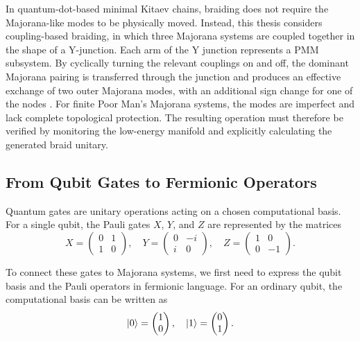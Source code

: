 In quantum-dot-based minimal Kitaev chains, braiding does not require the Majorana-like modes to be physically moved. Instead, this thesis considers coupling-based braiding, in which three Majorana systems are coupled together in the shape of a Y-junction. Each arm of the Y junction represents a PMM subsystem. By cyclically turning the relevant
couplings on and off, the dominant Majorana pairing is transferred through the junction and produces an effective exchange of two outer Majorana modes, with an additional sign change for one of the nodes \cite{nitschAdiabaticNonabelianBraiding2025}. For finite Poor Man's Majorana systems, the modes are imperfect and lack complete topological protection. The resulting operation must therefore be verified by monitoring
the low-energy manifold and explicitly calculating the generated braid unitary.


\subsection{From Qubit Gates to Fermionic Operators\newline}
Quantum gates are unitary operations acting on a chosen computational basis. For a single qubit, the Pauli gates $X$, $Y$, and $Z$ are represented by the matrices
\begin{equation}
X = \begin{pmatrix}
0 & 1 \\
1 & 0
\end{pmatrix}, \quad
Y = \begin{pmatrix}
0 & -i \\
i & 0
\end{pmatrix}, \quad
Z = \begin{pmatrix}
1 & 0 \\
0 & -1
\end{pmatrix}.
\end{equation}

To connect these gates to Majorana systems, we first need to express the qubit basis and the Pauli operators in fermionic language. For an ordinary qubit, the computational basis can be written as
\begin{equation}
\ket{0} = \begin{pmatrix}1 \\
0
\end{pmatrix}, \quad
\ket{1} = \begin{pmatrix}0 \\
1
\end{pmatrix}.
\end{equation}

